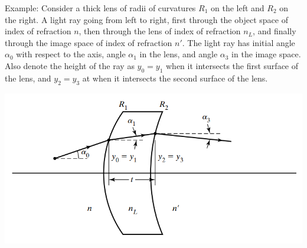 \documentclass[11pt]{book}
\theoremstyle{break}
\theoremstyle{break}
\newcommand{\example}{\color{green}Example: \color{black}}
\begin{document}
\hfill\break
\hfill\break
\example Consider a thick lens of radii of curvatures $R_1$ on the left and $R_2$ on the right. A light ray going from left to right, first through the object space of index of refraction $n$, then through the lens of index of refraction $n_L$, and finally through the image space of index of refraction $n'$. The light ray has initial angle $\alpha_0$ with respect to the axis, angle $\alpha_1$ in the lens, and angle $\alpha_3$ in the image space. Also denote the height of the ray as $y_0 = y_1$ when it intersects the first surface of the lens, and $y_2 = y_3$ at when it intersects the second surface of the lens.
\begin{center}
\includegraphics[scale=0.55]{matEx.png}
\end{center}
\end{document}
